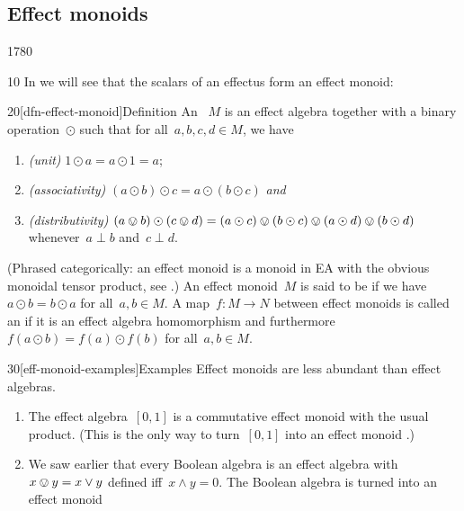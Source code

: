 \subsection{Effect monoids}
\begin{parsec}{1780}%
\begin{point}{10}%
In  we will see that the scalars of an effectus
form an effect monoid:
\end{point}
\begin{point}{20}[dfn-effect-monoid]{Definition}%
An ~$M$ \cite{probdistrconv}
    is an effect algebra
    together with a binary operation~$\odot$
    such that for all~$a,b,c,d \in M$, we have
\begin{enumerate}
    \item \emph{(unit)}
    $1 \odot a = a \odot 1 = a$;
\item \emph{(associativity)}
    $(a \odot b) \odot c 
    =a \odot (b \odot c)$ \emph{and}
\item \emph{(distributivity)}
    $(a \ovee b) \odot (c \ovee d)
            = (a \odot c) \ovee (b \odot c) \ovee
            (a \odot d) \ovee (b \odot d)$
            whenever~$a \perp b$ and~$c \perp d$.
\end{enumerate}
(Phrased categorically:
    an effect monoid is a monoid in \textsf{EA}
    with the obvious monoidal tensor product, see \cite{corefl,probdistrconv}.)
An effect monoid~$M$ is said to be 
    if we have~$a\odot b = b\odot a$ for all~$a,b \in M$.
A map~$f\colon M \to N$ between effect monoids
    is called an 
    if it is an effect algebra homomorphism
    and furthermore~$f(a \odot b) = f(a) \odot f(b)$
    for all~$a,b \in M$.
\end{point}
\begin{point}{30}[eff-monoid-examples]{Examples}%
Effect monoids are less abundant than effect algebras.
\begin{enumerate}
\item The effect algebra~$[0,1]$
        is a commutative effect monoid with the usual product.
        (This is the only way to turn~$[0,1]$ into an effect monoid
                \cite[Prop.~41]{basmsc}.)
\item We saw earlier that every Boolean algebra is an effect algebra
        with~$x \ovee y = x \vee y$ defined iff~$x \wedge y = 0$.
    The Boolean algebra is turned into an effect monoid

\end{enumerate}
\end{point}
\end{parsec}
